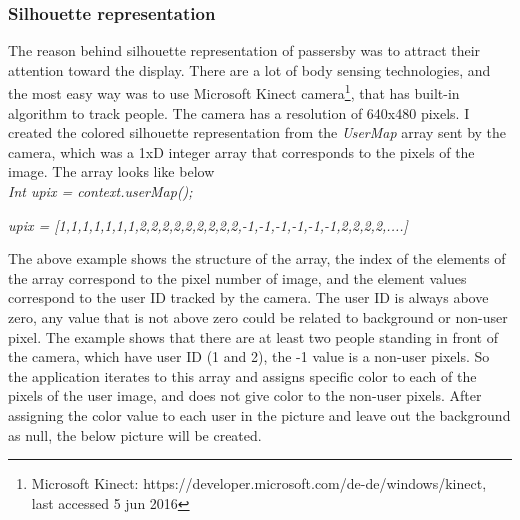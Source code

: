 \subsubsection{Silhouette representation}
The reason behind silhouette representation of passersby was to attract their attention toward the display. There are a lot of body sensing technologies, and the most easy way was to use Microsoft Kinect camera\footnote{Microsoft Kinect: https://developer.microsoft.com/de-de/windows/kinect, last accessed 5 jun 2016}, that has built-in algorithm to track people. The camera has a resolution of 640x480 pixels. I created the colored silhouette representation from the \emph{UserMap} array sent by the camera, which was a 1xD integer array that corresponds to the pixels of the image. The array looks like below \\

\emph {Int upix = context.userMap();}

\emph{upix = [1,1,1,1,1,1,1,2,2,2,2,2,2,2,2,2,-1,-1,-1,-1,-1,-1,2,2,2,2,....]}

The above example shows the structure of the array, the index of the elements of the array correspond to the pixel number of image, and the element values correspond to the user ID tracked by the camera. The user ID is always above zero, any value that is not above zero could be related to background or non-user pixel. The example shows that there are at least two people standing in front of the camera, which have user ID (1 and 2), the -1 value is a non-user pixels. 
So the application iterates to this array and assigns specific color to each of the pixels of the user image, and does not give color to the non-user pixels. After assigning the color value to each user in the picture and leave out the background as null, the below picture will be created.




